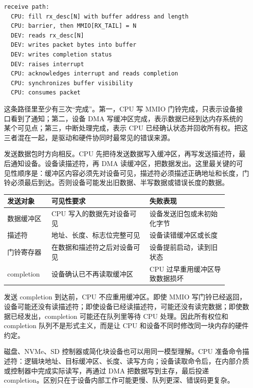 \begin{lstlisting}
receive path:
  CPU: fill rx_desc[N] with buffer address and length
  CPU: barrier, then MMIO[RX_TAIL] = N
  DEV: reads rx_desc[N]
  DEV: writes packet bytes into buffer
  DEV: writes completion status
  DEV: raises interrupt
  CPU: acknowledges interrupt and reads completion
  CPU: synchronizes buffer visibility
  CPU: consumes packet
\end{lstlisting}

这条路径里至少有三次“完成”。第一，CPU 写 MMIO 门铃完成，只表示设备接口看到了通知；第二，设备 DMA 写缓冲区完成，表示数据已经到达内存系统的某个可见点；第三，中断处理完成，表示 CPU 已经确认状态并回收所有权。把这三者混在一起，是驱动和硬件协同时最常见的错误来源。

发送数据包时方向相反。CPU 先把待发送数据写入缓冲区，再写发送描述符，最后通知设备。设备读描述符，再 DMA 读缓冲区，把数据发出。这里最关键的可见性顺序是：缓冲区内容必须先对设备可见，描述符必须描述正确地址和长度，门铃必须最后到达。否则设备可能发出旧数据、半写数据或错误长度的数据。

\begin{longtable}{L{0.18\linewidth}L{0.4\linewidth}L{0.32\linewidth}}
\toprule
发送对象 & 可见性要求 & 失败表现 \\
\midrule
数据缓冲区 & CPU 写入的数据先对设备可见 & 设备发送旧包或未初始化字节 \\
描述符 & 地址、长度、标志位完整可见 & 设备读错缓冲区或长度 \\
门铃寄存器 & 在数据和描述符之后对设备可见 & 设备提前启动，读到旧状态 \\
completion & 设备确认已不再读取缓冲区 & CPU 过早重用缓冲区导致数据损坏 \\
\bottomrule
\end{longtable}

发送 completion 到达前，CPU 不应重用缓冲区。即使 MMIO 写门铃已经返回，设备可能还没有读描述符；即使设备已经读描述符，可能还没有读完数据；即使数据已经发出，completion 可能还在队列里等待 CPU 处理。因此所有权位和 completion 队列不是形式主义，而是让 CPU 和设备不同时修改同一块内存的硬件约定。

磁盘、NVMe、SD 控制器或简化块设备也可以用同一模型理解。CPU 准备命令描述符：逻辑块地址、目标缓冲区、长度、读写方向；设备读取命令后，在内部介质或控制器中完成实际读写，再通过 DMA 把数据写到主存，最后投递 completion。区别只在于设备内部工作可能更慢、队列更深、错误码更复杂。

